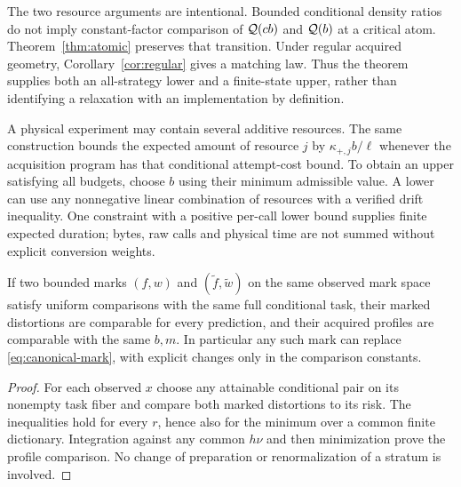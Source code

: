 The two resource arguments are intentional. Bounded conditional density ratios do not imply constant-factor comparison of $\mathcal Q(cb)$ and $\mathcal Q(b)$ at a critical atom. Theorem~\ref{thm:atomic} preserves that transition. Under regular acquired geometry, Corollary~\ref{cor:regular} gives a matching law. Thus the theorem supplies both an all-strategy lower and a finite-state upper, rather than identifying a relaxation with an implementation by definition.

A physical experiment may contain several additive resources. The same construction bounds the expected amount of resource $j$ by $\kappa_{+,j}b/\ell$ whenever the acquisition program has that conditional attempt-cost bound. To obtain an upper satisfying all budgets, choose $b$ using their minimum admissible value. A lower can use any nonnegative linear combination of resources with a verified drift inequality. One constraint with a positive per-call lower bound supplies finite expected duration; bytes, raw calls and physical time are not summed without explicit conversion weights.

\begin{corollary}\label{cor:mark-invariance}
If two bounded marks $(f,w)$ and $(\widetilde f,\widetilde w)$ on the same observed mark space satisfy uniform comparisons with the same full conditional task, their marked distortions are comparable for every prediction, and their acquired profiles are comparable with the same $b,m$. In particular any such mark can replace \eqref{eq:canonical-mark}, with explicit changes only in the comparison constants.
\end{corollary}
\begin{proof}
For each observed $x$ choose any attainable conditional pair on its nonempty task fiber and compare both marked distortions to its risk. The inequalities hold for every $r$, hence also for the minimum over a common finite dictionary. Integration against any common $h\nu$ and then minimization prove the profile comparison. No change of preparation or renormalization of a stratum is involved.
\end{proof}
